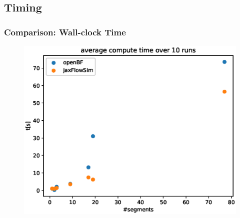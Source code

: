 \documentclass[compress]{beamer}
\begin{document}
\subsection{Timing}
\begin{frame}
	\frametitle{Comparison: Wall-clock Time}
	\begin{figure} [H]
		\centering
		\includegraphics[width=0.94\columnwidth]{../figures/timing_benchmark.eps}
		\label{fig:comparison}
	\end{figure}

\end{frame}
\end{document}
